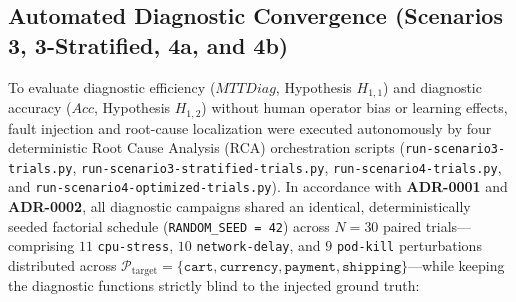\subsection{Automated Diagnostic Convergence (Scenarios 3, 3-Stratified, 4a, and 4b)}
To evaluate diagnostic efficiency ($MTTDiag$, Hypothesis $H_{1,1}$) and diagnostic accuracy ($Acc$, Hypothesis $H_{1,2}$) without human operator bias or learning effects, fault injection and root-cause localization were executed autonomously by four deterministic Root Cause Analysis (RCA) orchestration scripts (\texttt{run-scenario3-trials.py}, \texttt{run-scenario3-stratified-trials.py}, \texttt{run-scenario4-trials.py}, and \texttt{run-scenario4-optimized-trials.py}). In accordance with \textbf{ADR-0001} and \textbf{ADR-0002}, all diagnostic campaigns shared an identical, deterministically seeded factorial schedule (\texttt{RANDOM\_SEED = 42}) across $N=30$ paired trials---comprising $11$ \texttt{cpu-stress}, $10$ \texttt{network-delay}, and $9$ \texttt{pod-kill} perturbations distributed across $\mathcal{P}_{\text{target}} = \{\texttt{cart}, \texttt{currency}, \texttt{payment}, \texttt{shipping}\}$---while keeping the diagnostic functions strictly blind to the injected ground truth:

